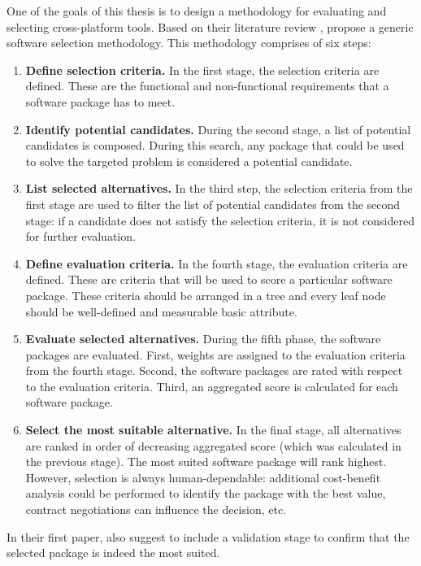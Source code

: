 One of the goals of this thesis is to design a methodology for evaluating and selecting cross-platform tools. Based on their literature review \cite{Jadhav:2009}, \citet{Jadhav:2011} propose a generic software selection methodology. This methodology comprises of six steps:

\begin{enumerate}
    \item \textbf{Define selection criteria.} In the first stage, the selection criteria are defined. These are the functional and non-functional requirements that a software package has to meet.
    \item \textbf{Identify potential candidates.} During the second stage, a list of potential candidates is composed. During this search, any package that could be used to solve the targeted problem is considered a potential candidate. 
    \item \textbf{List selected alternatives.} In the third step, the selection criteria from the first stage are used to filter the list of potential candidates from the second stage: if a candidate does not satisfy the selection criteria, it is not considered for further evaluation.
    \item \textbf{Define evaluation criteria.} In the fourth stage, the evaluation criteria are defined. These are criteria that will be used to score a particular software package. These criteria should be arranged in a tree and every leaf node should be well-defined and measurable basic attribute.
    \item \textbf{Evaluate selected alternatives.} During the fifth phase, the software packages are evaluated. First, weights are assigned to the evaluation criteria from the fourth stage. Second, the software packages are rated with respect to the evaluation criteria. Third, an aggregated score is calculated for each software package.
    \item \textbf{Select the most suitable alternative.} In the final stage, all alternatives are ranked in order of decreasing aggregated score (which was calculated in the previous stage). The most suited software package will rank highest. However, selection is always human-dependable: additional cost-benefit analysis could be performed to identify the package with the best value, contract negotiations can influence the decision, etc. 
\end{enumerate}

In their first paper, \citet{Jadhav:2009} also suggest to include a validation stage to confirm that the selected package is indeed the most suited. 

